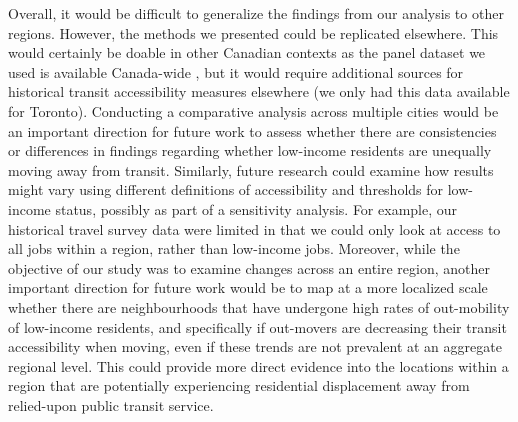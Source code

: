 Overall, it would be difficult to generalize the findings from our analysis to other regions. However, the methods we presented could be replicated elsewhere. This would certainly be doable in other Canadian contexts as the panel dataset we used is available Canada-wide \cite{government_of_canada_longitudinal_2020}, but it would require additional sources for historical transit accessibility measures elsewhere (we only had this data available for Toronto). Conducting a comparative analysis across multiple cities would be an important direction for future work to assess whether there are consistencies or differences in findings regarding whether low-income residents are unequally moving away from transit. Similarly, future research could examine how results might vary using different definitions of accessibility and thresholds for low-income status, possibly as part of a sensitivity analysis. For example, our historical travel survey data were limited in that we could only look at access to all jobs within a region, rather than low-income jobs. Moreover, while the objective of our study was to examine changes across an entire region, another important direction for future work would be to map at a more localized scale whether there are neighbourhoods that have undergone high rates of out-mobility of low-income residents, and specifically if out-movers are decreasing their transit accessibility when moving, even if these trends are not prevalent at an aggregate regional level. This could provide more direct evidence into the locations within a region that are potentially experiencing residential displacement away from relied-upon public transit service.